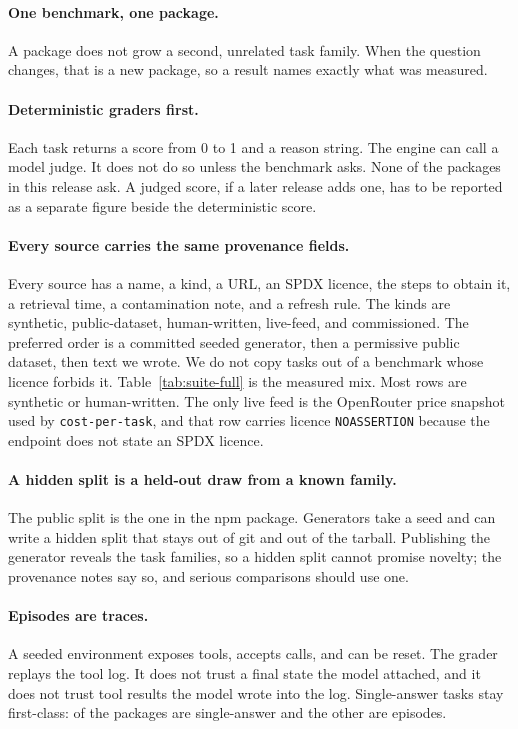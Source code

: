 \paragraph{One benchmark, one package.}
A package does not grow a second, unrelated task family. When the question changes, that is a new package, so a result names exactly what was measured.

\paragraph{Deterministic graders first.}
Each task returns a score from 0 to 1 and a reason string. The engine can call a model judge. It does not do so unless the benchmark asks. None of the packages in this release ask. A judged score, if a later release adds one, has to be reported as a separate figure beside the deterministic score.

\paragraph{Every source carries the same provenance fields.}
Every source has a name, a kind, a URL, an SPDX licence, the steps to obtain it, a retrieval time, a contamination note, and a refresh rule. The kinds are synthetic, public-dataset, human-written, live-feed, and commissioned. The preferred order is a committed seeded generator, then a permissive public dataset, then text we wrote. We do not copy tasks out of a benchmark whose licence forbids it. Table~\ref{tab:suite-full} is the measured mix. Most rows are synthetic or human-written. The only live feed is the OpenRouter price snapshot used by \texttt{cost-per-task}, and that row carries licence \texttt{NOASSERTION} because the endpoint does not state an SPDX licence.

\paragraph{A hidden split is a held-out draw from a known family.}
The public split is the one in the npm package. Generators take a seed and can write a hidden split that stays out of git and out of the tarball. Publishing the generator reveals the task families, so a hidden split cannot promise novelty; the provenance notes say so, and serious comparisons should use one.

\paragraph{Episodes are traces.}
A seeded environment exposes tools, accepts calls, and can be reset. The grader replays the tool log. It does not trust a final state the model attached, and it does not trust tool results the model wrote into the log. Single-answer tasks stay first-class: \suiteSingle{} of the \suitePackages{} packages are single-answer and the other \suiteEpisode{} are episodes.

